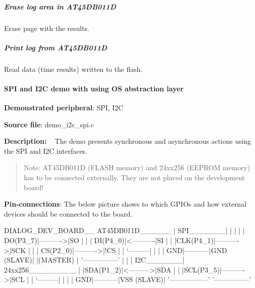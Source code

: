 \subparagraph*{Erase log area in A\+T45\+D\+B011\+D}

Erase page with the results.

\subparagraph*{Print log from A\+T45\+D\+B011\+D}

Read data (time results) written to the flash.

\paragraph*{S\+P\+I and I2\+C demo with using O\+S abstraction layer}


\begin{DoxyItemize}
\item {\bfseries Demonstrated peripheral}\+: S\+P\+I, I2\+C
\item {\bfseries Source file}\+: demo\+\_\+i2c\+\_\+spi.\+c
\item {\bfseries Description\+:} ~\newline
 The demo presents synchronous and asynchronous actions using the S\+P\+I and I2\+C interfaces.
\end{DoxyItemize}

\begin{quote}
Note\+: A\+T45\+D\+B011\+D (F\+L\+A\+S\+H memory) and 24xx256 (E\+E\+P\+R\+O\+M memory) has to be connected externally. They are not placed on the development board! \end{quote}



\begin{DoxyItemize}
\item {\bfseries Pin-\/connections}\+: The below picture shows to which G\+P\+I\+Os and how external devices should be connected to the board.
\end{DoxyItemize}


\begin{DoxyPre}
   DIALOG\_DEV\_BOARD\_\_            AT45DB011D\_\_\_\_\_\_
   |       SPI\_\_\_\_\_\_\_|           |               |
   |       | DO(P3\_7)|---------->|SO             |
   |       | DI(P4\_0)|<----------|SI             |
   |       |CLK(P4\_1)|---------->|SCK            |
   |       | CS(P2\_0)|---------->|!CS            |
   |       `---------|           |               |
   |              GND|-----------|GND     (SLAVE)|
   |(MASTER)         |           '---------------'
   |                 |
   |       I2C\_\_\_\_\_\_\_|           24xx256\_\_\_\_\_\_\_\_\_
   |       |SDA(P1\_2)|<--------->|SDA            |
   |       |SCL(P3\_5)|---------->|SCL            |
   |       `---------|           |               |
   |              GND|-----------|VSS     (SLAVE)|
   '-----------------'           '---------------'
\end{DoxyPre}



